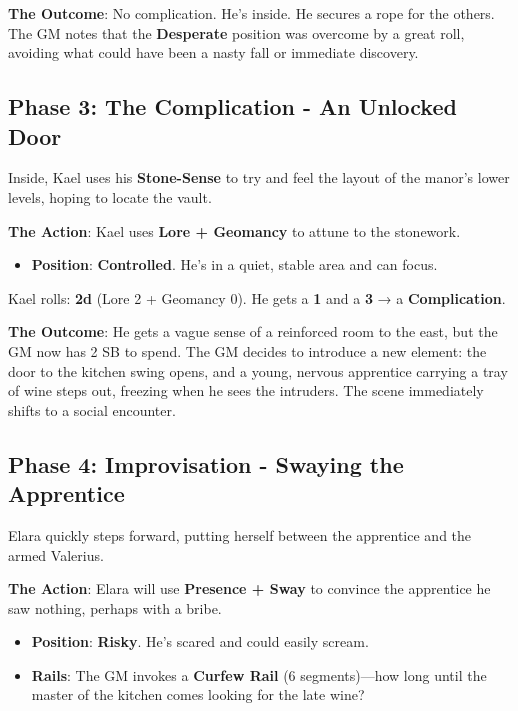 \textbf{The Outcome}: No complication. He's inside. He secures a rope for the others. The GM notes that the \textbf{Desperate} position was overcome by a great roll, avoiding what could have been a nasty fall or immediate discovery.

\subsection*{Phase 3: The Complication - An Unlocked Door}

Inside, Kael uses his \textbf{Stone-Sense} to try and feel the layout of the manor's lower levels, hoping to locate the vault.

\textbf{The Action}: Kael uses \textbf{Lore + Geomancy} to attune to the stonework.

\begin{itemize}
    \item \textbf{Position}: \textbf{Controlled}. He's in a quiet, stable area and can focus.
\end{itemize}

Kael rolls: \textbf{2d} (Lore 2 + Geomancy 0). He gets a \textbf{1} and a \textbf{3} → a \textbf{Complication}.

\textbf{The Outcome}: He gets a vague sense of a reinforced room to the east, but the GM now has 2 SB to spend. The GM decides to introduce a new element: the door to the kitchen swing opens, and a young, nervous apprentice carrying a tray of wine steps out, freezing when he sees the intruders. The scene immediately shifts to a social encounter.

\subsection*{Phase 4: Improvisation - Swaying the Apprentice}

Elara quickly steps forward, putting herself between the apprentice and the armed Valerius.

\textbf{The Action}: Elara will use \textbf{Presence + Sway} to convince the apprentice he saw nothing, perhaps with a bribe.

\begin{itemize}
    \item \textbf{Position}: \textbf{Risky}. He's scared and could easily scream.
    \item \textbf{Rails}: The GM invokes a \textbf{Curfew Rail} (6 segments)—how long until the master of the kitchen comes looking for the late wine?
\end{itemize}

